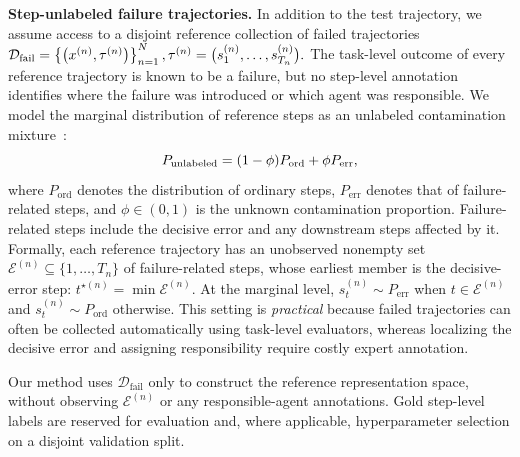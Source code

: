 \textbf{Step-unlabeled failure trajectories.}
In addition to the test trajectory, we assume access to a disjoint reference
collection of failed trajectories
$
    \mathcal{D}_{\mathrm{fail}}
    =
    \left\{
        \bigl(x^{(n)},\tau^{(n)}\bigr)
    \right\}_{n=1}^{N},
    \tau^{(n)}
    =
    \bigl(s^{(n)}_1,\ldots,s^{(n)}_{T_n}\bigr).
$
The task-level outcome of every reference trajectory is known to be a
failure, but no step-level annotation identifies where the failure was
introduced or which agent was responsible.
We model the  marginal distribution of reference steps as an unlabeled
contamination mixture~\citep{huber1964robust}:
\begin{equation}
\small
    P_{\mathrm{unlabeled}}
    =
    (1-\phi)P_{\mathrm{ord}}
    +
    \phi P_{\mathrm{err}},
    \label{eq:step-contamination}
\end{equation}
where $P_{\mathrm{ord}}$ denotes the distribution of ordinary steps,
$P_{\mathrm{err}}$ denotes that of failure-related steps, and
$\phi\in(0,1)$ is the unknown contamination proportion.
Failure-related steps include the decisive error and any downstream steps
affected by it. Formally, each reference trajectory has an unobserved nonempty set
$\mathcal{E}^{(n)}\subseteq\{1,\ldots,T_n\}$ of failure-related steps, whose
earliest member is the decisive-error step:
$
    t^{\star(n)}
    =
    \min\mathcal{E}^{(n)}.
$
At the marginal level,
$s_t^{(n)}\sim P_{\mathrm{err}}$ when
$t\in\mathcal{E}^{(n)}$ and
$s_t^{(n)}\sim P_{\mathrm{ord}}$ otherwise.
This setting is \textit{practical} because failed trajectories can often be collected
automatically using task-level evaluators, whereas localizing the decisive
error and assigning responsibility require costly expert annotation.

Our method uses $\mathcal{D}_{\mathrm{fail}}$ only to construct the reference
representation space, without observing $\mathcal{E}^{(n)}$ or any
responsible-agent annotations.
Gold step-level labels are reserved for evaluation and, where applicable,
hyperparameter selection on a disjoint validation split.





